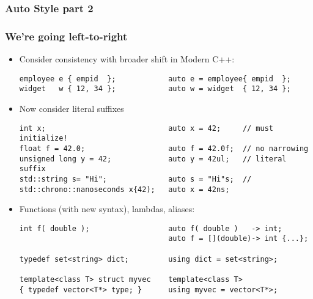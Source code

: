 \begin{frame}[fragile]
\frametitle{Auto Style part 2}
\frametitle{We're going left-to-right}
\begin{itemize}[<+->]
\item Consider consistency with broader shift in Modern C++:
{\scriptsize \begin{verbatim}
employee e { empid  };            auto e = employee{ empid  };
widget   w { 12, 34 };            auto w = widget  { 12, 34 };
\end{verbatim} }
\item Now consider literal suffixes
{\scriptsize \begin{verbatim}
int x;                            auto x = 42;     // must initialize!
float f = 42.0;                   auto f = 42.0f;  // no narrowing
unsigned long y = 42;             auto y = 42ul;   // literal suffix
std::string s= "Hi";              auto s = "Hi"s;  //
std::chrono::nanoseconds x{42);   auto x = 42ns;
\end{verbatim} }
\item Functions (with new syntax), lambdas, aliases:
{\scriptsize \begin{verbatim}
int f( double );                  auto f( double )   -> int; 
                                  auto f = [](double)-> int {...};

typedef set<string> dict;         using dict = set<string>;

template<class T> struct myvec    template<class T>
{ typedef vector<T*> type; }      using myvec = vector<T*>;
\end{verbatim} }
\end{itemize} %
\begin{center}\end{center}
\end{frame}


